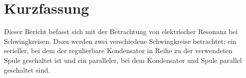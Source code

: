 
\section{Kurzfassung}

Dieser Bericht befasst sich mit der Betrachtung von elektrischer Resonanz bei Schwingkreisen.
Dazu werden zwei verschiedene Schwingkreise betrachtet; ein serieller, bei dem der regulierbare Kondensator in Reihe zu der verwendeten Spule geschaltet ist und ein paralleler, bei dem Kondensator und Spule parallel geschaltet sind.